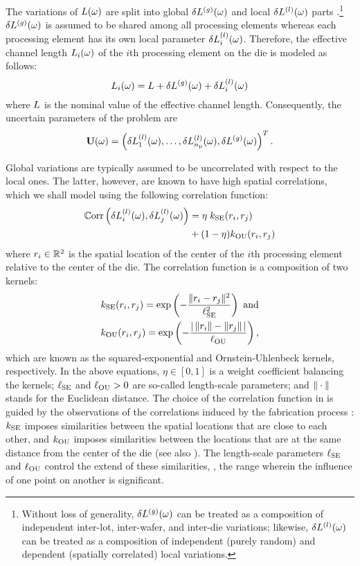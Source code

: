 
The variations of $L(\omega)$ are split into global ${\delta L^{(g)}}(\omega)$ and local $\delta L^{(l)}(\omega)$ parts \cite{chandra2010, shen2009}.\footnote{Without loss of generality, ${\delta L^{(g)}}(\omega)$ can be treated as a composition of independent inter-lot, inter-wafer, and inter-die variations; likewise, $\delta L^{(l)}(\omega)$ can be treated as a composition of independent (purely random) and dependent (spatially correlated) local variations.}
${\delta L^{(g)}}(\omega)$ is assumed to be shared among all processing elements whereas each processing element has its own local parameter $\delta L^{(l)}_i(\omega)$.
Therefore, the effective channel length $L_i(\omega)$ of the $i$th processing element on the die is modeled as follows:
\begin{equation} \elabel{leakage-partition}
  \Leff_i(\o) = \nLeff + \gLeff(\o) + \lLeff_i(\o)
\end{equation}
where $L$ is the nominal value of the effective channel length. Consequently, the uncertain parameters of the problem are
\begin{equation} \elabel{uncertain-parameters}
  \vU(\o) = \vec{\lLeff_1(\o), \dotsc, \lLeff_\nprocs(\o), \gLeff(\o) }.
\end{equation}

Global variations are typically assumed to be uncorrelated with respect to the local ones.
The latter, however, are known to have high spatial correlations, which we shall model using the following correlation function:
\begin{align}
  \oCorr{\lLeff_i(\o), \lLeff_j(\o)} &= \eta \; \fCorr_\SE(\r_i, \r_j) \nonumber \\
  & {} + (1 - \eta) \fCorr_\OU(\r_i, \r_j) \elabel{correlation-function}
\end{align}
where $r_i \in \mathbb{R}^2$ is the spatial location of the center of the $i$th processing element relative to the center of the die. The correlation function is a composition of two kernels:
\begin{align*}
  & \fCorr_\SE(\r_i, \r_j) = \exp\left(-\frac{\norm{\r_i - \r_j}^2}{\ell_\SE^2}\right) \text{ and} \\
  & \fCorr_\OU(\r_i, \r_j) = \exp\left(- \frac{\abs{\,\norm{\r_i} - \norm{\r_j}\,}}{\ell_\OU} \right),
\end{align*}
which are known as the squared-exponential and Ornstein-Uhlenbeck kernels, respectively.
In the above equations, $\eta \in [0, 1]$ is a weight coefficient balancing the kernels; $\ell_{\text{SE}}$ and $\ell_{\text{OU}} > 0$ are so-called length-scale parameters; and $\| \cdot \|$ stands for the Euclidean distance.
The choice of the correlation function in  is guided by the observations of the correlations induced by the fabrication process \cite{chandrakasan2001, friedberg2005, cheng2011}: $\fCorr_\SE$ imposes similarities between the spatial locations that are close to each other, and $\fCorr_\OU$ imposes similarities between the locations that are at the same distance from the center of the die (see also \cite{ghanem1991, bhardwaj2008, ghanta2006}).
The length-scale parameters $\ell_{\text{SE}}$ and $\ell_{\text{OU}}$ control the extend of these similarities, \ie, the range wherein the influence of one point on another is significant.

